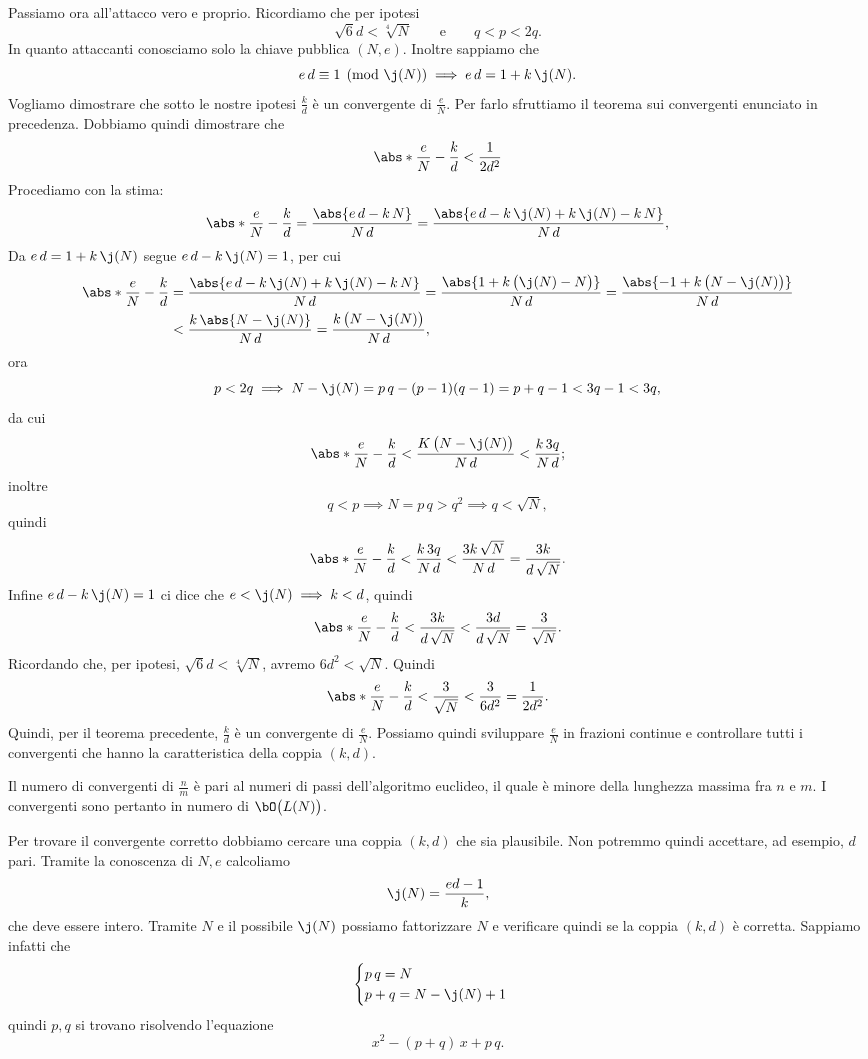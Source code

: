 	Passiamo ora all'attacco vero e proprio. Ricordiamo che per ipotesi
		\[
		\sqrt{6}d < \sqrt[4]{N} \qquad\text{e}\qquad q < p < 2q.
		\]
	In quanto attaccanti conosciamo solo la chiave pubblica \((N,e)\). Inoltre sappiamo che
		\[
		e\,d \equiv 1 \pmod{\j(N)} \implies e\,d = 1 + k\,\j(N).
		\]
	Vogliamo dimostrare che sotto le nostre ipotesi \(\frac{k}{d}\) è un convergente di \(\frac{e}{N}\).
	Per farlo sfruttiamo il teorema sui convergenti enunciato in precedenza. Dobbiamo quindi dimostrare che
		\[
		\abs*{\frac{e}{N} - \frac{k}{d}} < \frac{1}{2d^2}
		\]
	Procediamo con la stima:
		\[
		\abs*{\frac{e}{N} - \frac{k}{d}} = \frac{\abs{e\,d-k\,N}}{N\,d} = \frac{\abs{e\,d-k\,\j(N)+k\,\j(N)-k\,N}}{N\,d},
		\]
	Da \(e\,d = 1 + k\,\j(N)\) segue \(e\,d-k\,\j(N)=1\), per cui
		\[
		\begin{split}
		\abs*{\frac{e}{N} - \frac{k}{d}} & = \frac{\abs{e\,d-k\,\j(N)+k\,\j(N)-k\,N}}{N\,d} = \frac{\abs{1+k\,\big(\j(N)-N\big)}}{N\,d} = \frac{\abs{-1+k\,\big(N-\j(N)\big)}}{N\,d}\\
		& < \frac{k\,\abs{N-\j(N)}}{N\,d} = \frac{k\,\big(N-\j(N)\big)}{N\,d},
		\end{split}
		\]
	ora
		\[
		p<2q \implies N-\j(N) = p\,q-(p-1)(q-1) = p+q-1 < 3q-1 < 3q,
		\]
	da cui
		\[
		\abs*{\frac{e}{N} - \frac{k}{d}} < \frac{K\,\big(N-\j(N)\big)}{N\,d} < \frac{k\,3q}{N\,d};
		\]
	inoltre
		\[
		q<p \implies N=p\,q > q^2 \implies q < \sqrt{N},
		\]
	quindi
		\[
		\abs*{\frac{e}{N} - \frac{k}{d}} < \frac{k\,3q}{N\,d} < \frac{3k\,\sqrt{N}}{N\,d} = \frac{3k}{d\,\sqrt{N}}.
		\]
	Infine \(e\,d-k\,\j(N)=1\) ci dice che \(e<\j(N) \implies k<d\), quindi
		\[
		\abs*{\frac{e}{N} - \frac{k}{d}} < \frac{3k}{d\,\sqrt{N}} < \frac{3d}{d\,\sqrt{N}} = \frac{3}{\sqrt{N}}.
		\]
	Ricordando che, per ipotesi, \(\sqrt{6}d < \sqrt[4]{N}\), avremo \(6d^2 < \sqrt{N}\). Quindi
		\[
		\abs*{\frac{e}{N} - \frac{k}{d}} < \frac{3}{\sqrt{N}} < \frac{3}{6 d^2} = \frac{1}{2d^2}.
		\]
	Quindi, per il teorema precedente, \(\frac{k}{d}\) è un convergente di \(\frac{e}{N}\).
	Possiamo quindi sviluppare \(\frac{e}{N}\) in frazioni continue e controllare tutti i convergenti che hanno la caratteristica della coppia \((k,d)\).

	\begin{oss}
	Il numero di convergenti di \(\frac{n}{m}\) è pari al numeri di passi dell'algoritmo euclideo, il quale è minore della lunghezza massima fra \(n\) e \(m\).
	I convergenti sono pertanto in numero di \(\bO\big(L(N)\big)\).
	\end{oss}
	\noindent
	Per trovare il convergente corretto dobbiamo cercare una coppia \((k,d)\) che sia plausibile.
	Non potremmo quindi accettare, ad esempio, \(d\) pari.
	Tramite la conoscenza di \(N,e\) calcoliamo
		\[
		\j(N) = \frac{ed-1}{k},
		\]
	che deve essere intero.
	Tramite \(N\) e il possibile \(\j(N)\) possiamo fattorizzare \(N\) e verificare quindi se la coppia \((k,d)\) è corretta.
	Sappiamo infatti che
		\[
		\begin{cases}
		p\,q = N\\
		p+q = N-\j(N)+1
		\end{cases}
		\]
	quindi \(p,q\) si trovano risolvendo l'equazione
		\[
		x^2-(p+q)\,x + p\,q.
		\]

